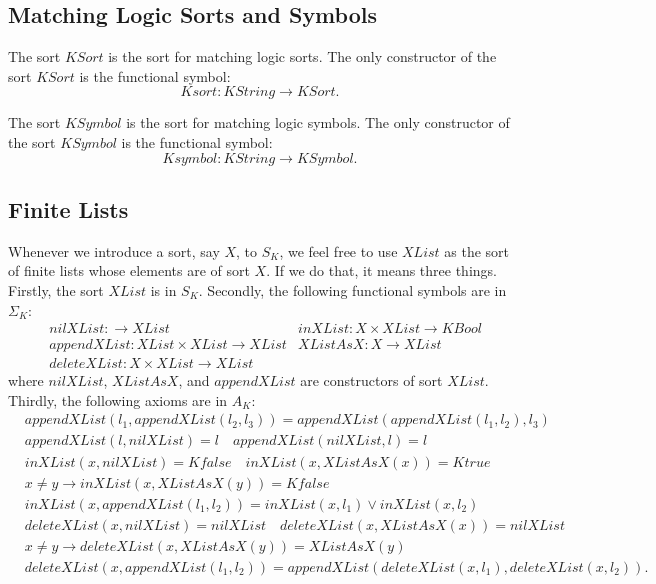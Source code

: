 \documentclass[UTF8]{article}
\theoremstyle{plain}
\theoremstyle{definition}
\theoremstyle{remark}
\newcommand{\KBool}{\mathit{KBool}}
\newcommand{\Ktrue}{\mathit{Ktrue}}
\newcommand{\Kfalse}{\mathit{Kfalse}}
\newcommand{\KString}{\mathit{KString}}
\newcommand{\KSort}{\mathit{KSort}}
\newcommand{\Ksort}{\mathit{Ksort}}
\newcommand{\KSymbol}{\mathit{KSymbol}}
\newcommand{\Ksymbol}{\mathit{Ksymbol}}
\begin{document}
\subsection{Matching Logic Sorts and Symbols}

The sort $\KSort$ is the sort for matching logic sorts.
The only constructor of the sort $\KSort$ is the functional symbol:
\begin{equation*}
\Ksort \colon \KString \to \KSort.
\end{equation*}

The sort $\KSymbol$ is the sort for matching logic symbols.
The only constructor of the sort $\KSymbol$ is the functional symbol:
\begin{equation*}
\Ksymbol \colon \KString \to \KSymbol.
\end{equation*}

\subsection{Finite Lists}
Whenever we introduce a sort, say $\mathit{X}$, to $S_K$, we feel free to 
use $\mathit{XList}$ as the sort of finite lists whose elements are of sort $\mathit{X}$. 
If we do that, it means three things.
Firstly, the sort $\mathit{XList}$ is in $S_K$.
Secondly, the following functional symbols are in $\Sigma_K$:
\begin{align*}
&\mathit{nilXList} \colon \to \mathit{XList}
&\mathit{inXList} \colon \mathit{X} \times \mathit{XList} \to \KBool
\\
&\mathit{appendXList} \colon \mathit{XList} \times \mathit{XList} \to 
\mathit{XList}
&\mathit{XListAsX} \colon \mathit{X} \to \mathit{XList}
\\
&\mathit{deleteXList} \colon \mathit{X} \times \mathit{XList} \to \mathit{XList}
\end{align*}
where $\mathit{nilXList}$, $\mathit{XListAsX}$, and $\mathit{appendXList}$ are constructors of sort $\mathit{XList}$.
Thirdly, the following axioms are in $A_K$:
\begin{align*}
&\mathit{appendXList}(l_1, \mathit{appendXList}(l_2, l_3)) = \mathit{appendXList}(\mathit{appendXList}(l_1, l_2), l_3)
\\
&\mathit{appendXList}(l, \mathit{nilXList}) = l
\quad \mathit{appendXList}(\mathit{nilXList}, l) = l
\\
&\mathit{inXList}(x, \mathit{nilXList}) = \Kfalse
\quad \mathit{inXList}(x, \mathit{XListAsX}(x)) = \Ktrue
\\
&x \neq y \to \mathit{inXList}(x, \mathit{XListAsX}(y)) = \Kfalse
\\
&\mathit{inXList}(x, \mathit{appendXList}(l_1, l_2)) = \mathit{inXList}(x, l_1) \vee \mathit{inXList}(x, l_2)
\\
&\mathit{deleteXList}(x, \mathit{nilXList}) = \mathit{nilXList}
\quad \mathit{deleteXList}(x, \mathit{XListAsX}(x)) = \mathit{nilXList}
\\
&x \neq y \to \mathit{deleteXList}(x, \mathit{XListAsX}(y)) = \mathit{XListAsX}(y)
\\
&\mathit{deleteXList}(x, \mathit{appendXList}(l_1, l_2)) = \mathit{appendXList}(\mathit{deleteXList}(x, l_1), \mathit{deleteXList}(x, l_2)).
\end{align*}
\end{document}
